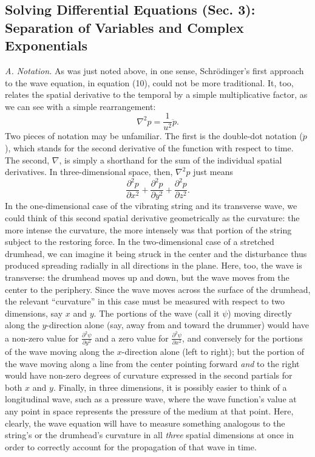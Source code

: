 \subsection*{Solving Differential Equations (Sec. 3): Separation of Variables and Complex Exponentials}

\emph{A. Notation.} As was just noted above, in one sense, Schrödinger's first approach to the wave 
equation, in equation (10), could not be more traditional. It, too, relates the 
spatial derivative to the temporal by a simple multiplicative factor, as we can
see with a simple rearrangement:
\begin{equation*}\tag{10'}
\nabla^2p = \frac{1}{u^2}\ddot{p}.
\end{equation*}
Two pieces of notation may be unfamiliar. The first is the double-dot notation ($\ddot{p}$), which
stands for the second derivative of the function with respect to time. The second, $\nabla$, is 
simply a shorthand for the sum of the individual spatial derivatives. In three-dimensional space, 
then, $\nabla^2p$ just means
\begin{equation*}
\frac{\partial^2p}{\partial x^2} + \frac{\partial^2p}{\partial y^2} + \frac{\partial^2p}{\partial z^2}.
\end{equation*}
In the one-dimensional case of the vibrating string and its transverse wave, we 
could think of this second spatial derivative geometrically as the curvature: the more
intense the curvature, the more intensely was that portion of the string subject to
the restoring force. In the two-dimensional case of a stretched drumhead, we can imagine
it being struck in the center and the disturbance thus produced spreading radially in all directions
in the plane. Here, too, the wave is transverse: the drumhead moves up and down, but the
wave moves from the center to the periphery. Since the wave moves across the surface of the 
drumhead, the relevant ``curvature'' in this case must
be measured with respect to two dimensions, say $x$ and $y$. The portions of the wave (call it 
$\psi$) 
moving directly along the $y$-direction alone (say, away from and toward the drummer)
would have a non-zero value for $\frac{\partial^2\psi}{\partial y^2}$
and a zero value for $\frac{\partial^2\psi}{\partial x^2}$, and conversely for the portions of
the wave moving along the $x$-direction alone (left to right); but the portion of the wave moving along a line
from the center pointing forward \emph{and} to the right would have non-zero degrees 
of curvature expressed 
in the second partials for both $x$ and $y$. Finally, in three dimensions, it is possibly
easier to think of a longitudinal wave, such as a pressure wave, where the wave
function's value at any point in space represents the pressure of the medium at that point.
Here, clearly, the wave equation will have to measure something analogous to the string's 
or the drumhead's curvature in all \emph{three} spatial dimensions at once in order to
correctly account for the propagation of that wave in time.

